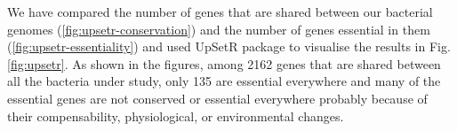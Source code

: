 \documentclass[12pt,letterpaper]{article}
\begin{document}
We have compared the number of genes that are shared between our bacterial genomes (\ref{fig:upsetr-conservation}) and the number of genes essential in them (\ref{fig:upsetr-essentiality}) and used UpSetR package \cite{conway_upsetr:_2016} to visualise the results in Fig.\@ \ref{fig:upsetr}. As shown in the figures, among 2162 genes that are shared between all the bacteria under study, only 135 are essential everywhere and many of the essential genes are not conserved or essential everywhere probably because of their compensability, physiological, or environmental changes. %
\end{document}
